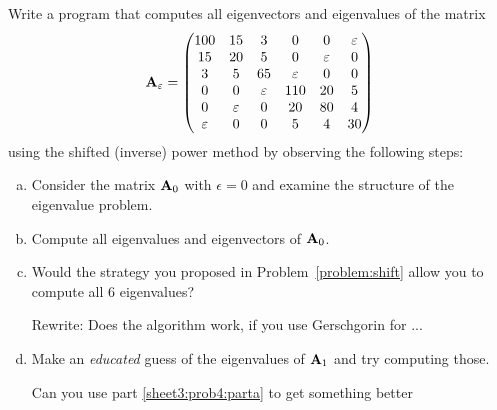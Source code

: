 \begin{Sheet}
  \begin{Problem}[Programming]
    Write a program that computes all eigenvectors and eigenvalues of
    the matrix
    \begin{gather*}
      \mathbf A_{\varepsilon} =
      \begin{pmatrix}
        100& 15& 3& 0& 0& \varepsilon \\
        15& 20& 5& 0& \varepsilon & 0 \\
        3& 5& 65& \varepsilon&  0& 0 \\
        0& 0& \varepsilon& 110& 20& 5 \\
        0& \varepsilon& 0& 20& 80& 4 \\
        \varepsilon& 0& 0& 5& 4& 30
      \end{pmatrix}
    \end{gather*}
    using the shifted (inverse) power method by observing the
    following steps:
    \begin{enumerate}[(a)]
    \item\label{sheet3:prob4:parta} Consider the matrix $\mathbf A_0$ with $\epsilon=0$ and examine
      the structure of the eigenvalue problem.
    \item Compute all eigenvalues and eigenvectors of $\mathbf A_0$.
    \item Would the strategy you proposed in
      Problem~\ref{problem:shift} allow you to compute all 6
      eigenvalues?
      \begin{todo}
        Rewrite: Does the algorithm work, if you use Gerschgorin for
        ...
      \end{todo}
    \item Make an \textit{educated} guess of the eigenvalues of
      $\mathbf A_1$ and try computing those.
      \begin{todo}
        Can you use part \eqref{sheet3:prob4:parta} to get something
        better
      \end{todo}
    \end{enumerate}
  \end{Problem}
\end{Sheet}


